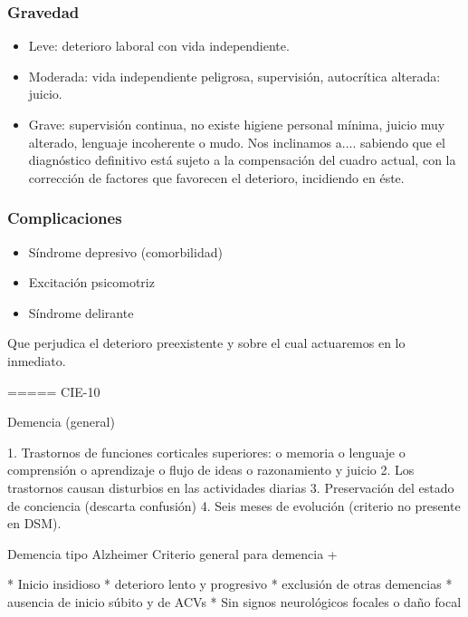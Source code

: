 \documentclass{scrbook}
\begin{document}
\subsubsection*{Gravedad}
\begin{itemize}
	\item Leve: deterioro laboral con vida independiente.
	\item Moderada: vida independiente peligrosa, supervisión, autocrítica alterada: juicio.
	\item Grave: supervisión continua, no existe higiene personal mínima, juicio muy alterado, lenguaje incoherente o mudo. Nos inclinamos a.... sabiendo que el diagnóstico definitivo está sujeto a la compensación del cuadro actual, con la corrección de factores que favorecen el deterioro, incidiendo en éste.
\end{itemize}
\subsubsection*{Complicaciones}
\begin{itemize}
	\item Síndrome depresivo (comorbilidad)
	\item Excitación psicomotriz
	\item Síndrome delirante
\end{itemize}
Que perjudica el deterioro preexistente y sobre el cual actuaremos en lo inmediato.

===== CIE-10

Demencia (general)

1. Trastornos de funciones corticales superiores: o memoria o lenguaje o comprensión o aprendizaje o flujo de ideas o razonamiento y juicio
2. Los trastornos causan disturbios en las actividades diarias
3. Preservación del estado de conciencia (descarta confusión)
4. Seis meses de evolución (criterio no presente en DSM).

Demencia tipo Alzheimer Criterio general para demencia +

* Inicio insidioso
* deterioro lento y progresivo
* exclusión de otras demencias
* ausencia de inicio súbito y de ACVs
* Sin signos neurológicos focales o daño focal
\end{document}
